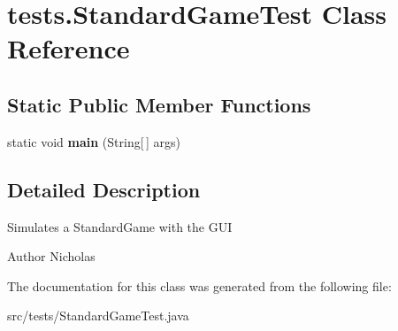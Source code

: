 \hypertarget{classtests_1_1_standard_game_test}{\section{tests.\-Standard\-Game\-Test Class Reference}
\label{classtests_1_1_standard_game_test}
}
\subsection*{Static Public Member Functions}
\begin{DoxyCompactItemize}
\item 
\hypertarget{classtests_1_1_standard_game_test_a72a09f86c1d5cb86b2ccf1d0252d67b4}{static void {\bfseries main} (String\mbox{[}$\,$\mbox{]} args)}\label{classtests_1_1_standard_game_test_a72a09f86c1d5cb86b2ccf1d0252d67b4}

\end{DoxyCompactItemize}


\subsection{Detailed Description}
Simulates a Standard\-Game with the G\-U\-I

\begin{DoxyAuthor}{Author}
Nicholas 
\end{DoxyAuthor}


The documentation for this class was generated from the following file\-:\begin{DoxyCompactItemize}
\item 
src/tests/Standard\-Game\-Test.\-java\end{DoxyCompactItemize}
